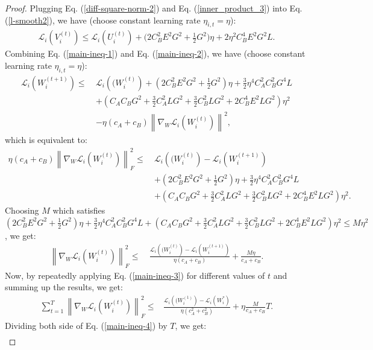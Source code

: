 \begin{proof}
Plugging Eq. (\ref{diff-square-norm-2}) and Eq. (\ref{inner_product_3}) into Eq. (\ref{l-smooth2}), we have (choose constant learning rate $\eta_{i,t}=\eta$):
\begin{align}\label{main-ineq-2}
\mathcal{L}_i\left(V_i^{(t)}\right) \leq \mathcal{L}_i\left(U_i^{(t)}\right)+\big(2C_B^2E^2G^2+\frac{1}{2}G^2\big)\eta+2\eta^2C_B^4 E^2 G^2L.
\end{align}
Combining Eq. (\ref{main-ineq-1}) and Eq. (\ref{main-ineq-2}), we have (choose constant learning rate $\eta_{i,t}=\eta$):
\begin{align*}
\mathcal{L}_i\left(W_i^{(t+1)}\right) 
\leq \ & \mathcal{L}_i\left((W_i^{(t)}\right)
+ (2C_B^2E^2G^2+\frac{1}{2}G^2)\eta + \frac{3}{2}\eta^4 C_A^2 C_B^2G^4L\\
&+(C_A C_B G^2+\frac{3}{2}C_A^2L G^2+\frac{3}{2}C_B^2L G^2+2C_B^4 E^2 L G^2)\eta^2\\
&- \eta (c_A+c_B) \left\|\nabla_{W}\mathcal{L}_i(W_i^{(t)})\right\|^2,
\end{align*}
which is equivalent to:
\begin{align*}
\eta (c_A+c_B) \left\|\nabla_{W}\mathcal{L}_i(W_i^{(t)})\right\|_F^2 
\leq \ & \mathcal{L}_i\left((W_i^{(t)}\right)-\mathcal{L}_i\left(W_i^{(t+1)}\right)\\
&+ (2C_B^2E^2G^2+\frac{1}{2}G^2)\eta + \frac{3}{2}\eta^4 C_A^2 C_B^2G^4L\\
&+(C_A C_B G^2+\frac{3}{2}C_A^2L G^2+\frac{3}{2}C_B^2L G^2+2C_B^4 E^2 L G^2)\eta^2.
\end{align*}
Choosing $M$ which satisfies $(2C_B^2E^2G^2+\frac{1}{2}G^2)\eta + \frac{3}{2}\eta^4 C_A^2 C_B^2G^4L+(C_A C_B G^2+\frac{3}{2}C_A^2L G^2+\frac{3}{2}C_B^2L G^2+2C_B^4 E^2 L G^2)\eta^2 \leq M\eta^2$, we get:
\begin{align}\label{main-ineq-3}
\left\|\nabla_{W}\mathcal{L}_i(W_i^{(t)})\right\|_F^2 
\leq \ & \frac{\mathcal{L}_i\left((W_i^{(t)}\right)-\mathcal{L}_i\left(W_i^{(t+1)}\right)}{\eta(c_A+c_B)}+\frac{M\eta}{c_A+c_B}.
\end{align}
Now, by repeatedly applying Eq. (\ref{main-ineq-3}) for different values of $t$ and summing up the results, we get:
\begin{align}\label{main-ineq-4}
\sum_{t=1}^T\left\|\nabla_{W}\mathcal{L}_i(W_i^{(t)})\right\|_F^2 
\leq & \frac{\mathcal{L}_i\left((W_i^{(1)}\right)-\mathcal{L}_i\left(W_i^{*}\right)}{\eta(c_A^2+c_B^2)}+\eta \frac{M}{c_A+c_B}T.
\end{align}
Dividing both side of Eq. (\ref{main-ineq-4}) by $T$, we get:
\begin{align}\label{main-ineq-5}

\end{align}
\end{proof}
